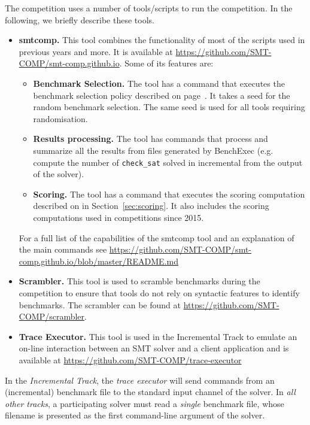 \documentclass[12pt]{article}
\newcommand{\inctrack}{Incremental Track\xspace}
\begin{document}
 \label{tools}
The competition uses a number of tools/scripts to run the competition. In the
following, we briefly describe these tools.
\begin{itemize}
  \item \textbf{smtcomp.} This tool combines the functionality of most of the
    scripts used in previous years and more. It is available at
    \url{https://github.com/SMT-COMP/smt-comp.github.io}. Some of its features are:
    \begin{itemize}
      \item \textbf{Benchmark Selection.} The tool has a command that executes the
        benchmark selection policy described on page~\pageref{benchmark-selection}.
        It takes a seed for the random benchmark selection. The same seed is used
        for all tools requiring randomisation.
      \item \textbf{Results processing.} The tool has commands that process and
        summarize all the results from files generated by BenchExec (e.g. compute the number of \texttt{check\_sat} solved in incremental from the output of the solver).
      \item \textbf{Scoring.} The tool has a command that executes the scoring computation described on in Section~\ref{sec:scoring}. It also includes the scoring
        computations used in competitions since 2015.
    \end{itemize}
    For a full list of the capabilities of the smtcomp tool and an explanation of the
    main commands
    see \url{https://github.com/SMT-COMP/smt-comp.github.io/blob/master/README.md}
  \item \textbf{Scrambler.} This tool is used to scramble benchmarks during the
    competition to ensure that tools do not rely on syntactic features to
    identify benchmarks. The scrambler can be found at
    \url{https://github.com/SMT-COMP/scrambler}.
  \item \textbf{Trace Executor.} This tool is used in the \inctrack to emulate
    an on-line interaction between an SMT solver and a client application and
    is available at \url{https://github.com/SMT-COMP/trace-executor}
\end{itemize}

%
In the \emph{\inctrack}, the \emph{trace executor} will send commands from an
(incremental) benchmark file to the standard input channel of the solver.  In
\emph{all other tracks}, a participating solver must read a \emph{single}
benchmark file, whose filename is presented as the first command-line argument
of the solver.
\end{document}
